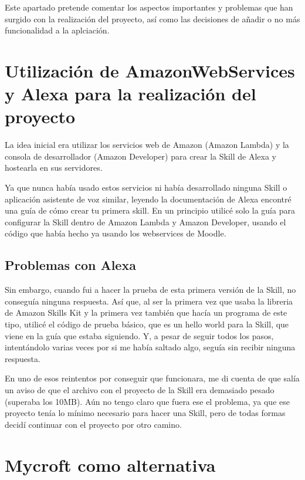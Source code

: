 
Este apartado pretende comentar los aspectos importantes y problemas que han surgido con la realización del proyecto, así como las decisiones de añadir o no más funcionalidad a la aplciación.

\section{Utilización de AmazonWebServices y Alexa para la realización del proyecto}

La idea inicial era utilizar los servicios web de Amazon (Amazon Lambda) y la consola de desarrollador (Amazon Developer) para crear la Skill de Alexa y hostearla en sus servidores.

Ya que nunca había usado estos servicios ni había desarrollado ninguna Skill o aplicación asistente de voz similar, leyendo la documentación de Alexa encontré una guía de cómo crear tu primera skill\cite{noauthor_firstskill_nodate}. En un principio utilicé solo la guía para configurar la Skill dentro de Amazon Lambda y Amazon Developer, usando el código que había hecho ya usando los webservices de Moodle.

\subsection{Problemas con Alexa}

Sin embargo, cuando fui a hacer la prueba de esta primera versión de la Skill, no conseguía ninguna respuesta. Así que, al ser la primera vez que usaba la libreria de Amazon Skills Kit y la primera vez también que hacía un programa de este tipo, utilicé el código de prueba básico, que es un hello world para la Skill, que viene en la guía que estaba siguiendo. Y, a pesar de seguir todos los pasos, intentándolo varias veces por si me había saltado algo, seguía sin recibir ninguna respuesta.

En uno de esos reintentos por conseguir que funcionara, me di cuenta de que salía un aviso de que el archivo con el proyecto de la Skill era demasiado pesado (superaba los 10MB). Aún no tengo claro que fuera ese el problema, ya que ese proyecto tenía lo mínimo necesario para hacer una Skill, pero de todas formas decidí continuar con el proyecto por otro camino.

\section{Mycroft como alternativa}

